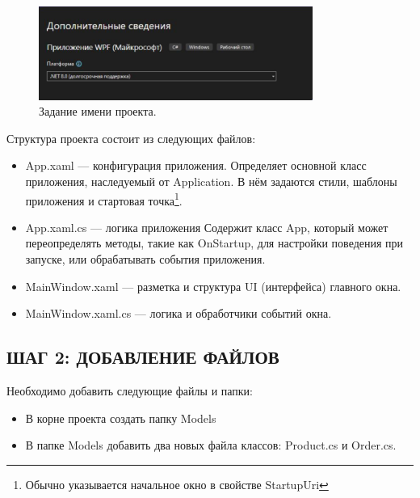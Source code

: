 \documentclass[12pt]{article}
\begin{document}
\begin{enumerate}
	      \begin{figure}[H]
		      \centering
		      \includegraphics[width=0.8\textwidth]{fig/net8.0.png}
		      \caption{Задание имени проекта.}
		      \label{fig:net8}
	      \end{figure}

\end{enumerate}

Структура проекта состоит из следующих файлов:

\begin{itemize}
	\item App.xaml — конфигурация приложения. Определяет основной класс приложения, наследуемый от Application. В нём задаются стили, шаблоны приложения и стартовая точка\footnote{Обычно указывается начальное окно в свойстве StartupUri}.
	\item App.xaml.cs — логика приложения Содержит класс App, который может переопределять методы, такие как OnStartup, для настройки поведения при запуске, или обрабатывать события приложения.
	\item MainWindow.xaml — разметка и структура UI (интерфейса) главного окна.
	\item MainWindow.xaml.cs — логика и обработчики событий окна.
\end{itemize}



\newpage

\subsection{ШАГ 2: ДОБАВЛЕНИЕ ФАЙЛОВ}

{}

Необходимо добавить следующие файлы и папки:
\begin{itemize}
	\item В корне проекта создать папку Models
	\item В папке Models добавить два новых файла классов: Product.cs и Order.cs.
\end{itemize}
\end{document}

